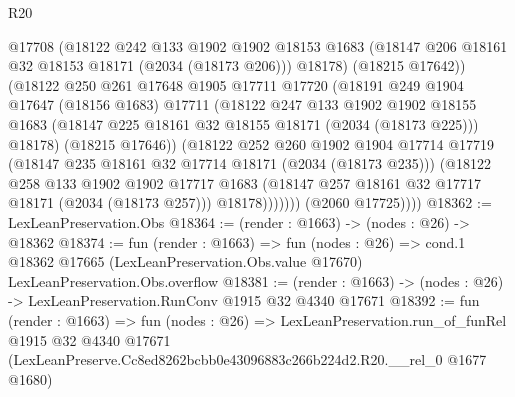 \begin{lexlean}{R20}
\begin{coremodule}
                    @17708
                    (@18122
                      @242
                      @133
                      @1902
                      @1902
                      @18153
                      @1683
                      (@18147 @206 @18161 @32 @18153 @18171 (@2034 (@18173 @206)))
                      @18178)
                    (@18215 @17642))
                  (@18122
                    @250
                    @261
                    @17648
                    @1905
                    @17711
                    @17720
                    (@18191
                      @249
                      @1904
                      @17647
                      (@18156 @1683)
                      @17711
                      (@18122
                        @247
                        @133
                        @1902
                        @1902
                        @18155
                        @1683
                        (@18147 @225 @18161 @32 @18155 @18171 (@2034 (@18173 @225)))
                        @18178)
                      (@18215 @17646))
                    (@18122
                      @252
                      @260
                      @1902
                      @1904
                      @17714
                      @17719
                      (@18147 @235 @18161 @32 @17714 @18171 (@2034 (@18173 @235)))
                      (@18122
                        @258
                        @133
                        @1902
                        @1902
                        @17717
                        @1683
                        (@18147 @257 @18161 @32 @17717 @18171 (@2034 (@18173 @257)))
                        @18178)))))))
          (@2060 @17725))))
@18362 := LexLeanPreservation.Obs
@18364 := (render : @1663) -> (nodes : @26) -> @18362
@18374 := fun (render : @1663) =>
  fun (nodes : @26) =>
  cond.{1} @18362 @17665 (LexLeanPreservation.Obs.value @17670) LexLeanPreservation.Obs.overflow
@18381 := (render : @1663) -> (nodes : @26) -> LexLeanPreservation.RunConv @1915 @32 @4340 @17671
@18392 := fun (render : @1663) =>
  fun (nodes : @26) =>
  LexLeanPreservation.run_of_funRel
    @1915
    @32
    @4340
    @17671
    (LexLeanPreserve.Cc8ed8262bcbb0e43096883c266b224d2.R20.__rel_0 @1677 @1680)
\end{coremodule}
\end{lexlean}
